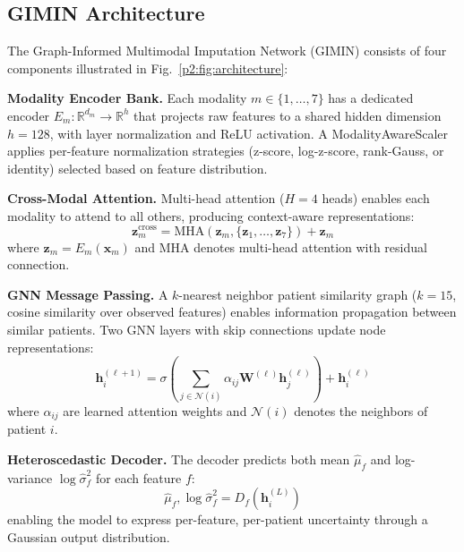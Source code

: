 \subsection{GIMIN Architecture}
\label{p2:sec:gimin}

The Graph-Informed Multimodal Imputation Network (GIMIN) consists of four components illustrated in Fig.~\ref{p2:fig:architecture}:

\textbf{Modality Encoder Bank.} Each modality $m \in \{1, \ldots, 7\}$ has a dedicated encoder $E_m: \mathbb{R}^{d_m} \to \mathbb{R}^{h}$ that projects raw features to a shared hidden dimension $h = 128$, with layer normalization and ReLU activation. A ModalityAwareScaler applies per-feature normalization strategies (z-score, log-z-score, rank-Gauss, or identity) selected based on feature distribution.

\textbf{Cross-Modal Attention.} Multi-head attention ($H = 4$ heads) enables each modality to attend to all others, producing context-aware representations:
\begin{equation}
\mathbf{z}_m^{\text{cross}} = \text{MHA}(\mathbf{z}_m, \{\mathbf{z}_1, \ldots, \mathbf{z}_7\}) + \mathbf{z}_m
\label{p2:eq:cross_attn}
\end{equation}
where $\mathbf{z}_m = E_m(\mathbf{x}_m)$ and MHA denotes multi-head attention with residual connection.

\textbf{GNN Message Passing.} A $k$-nearest neighbor patient similarity graph ($k = 15$, cosine similarity over observed features) enables information propagation between similar patients. Two GNN layers with skip connections update node representations:
\begin{equation}
\mathbf{h}_i^{(\ell+1)} = \sigma\!\left(\sum_{j \in \mathcal{N}(i)} \alpha_{ij} \mathbf{W}^{(\ell)} \mathbf{h}_j^{(\ell)}\right) + \mathbf{h}_i^{(\ell)}
\label{p2:eq:gnn}
\end{equation}
where $\alpha_{ij}$ are learned attention weights and $\mathcal{N}(i)$ denotes the neighbors of patient $i$.

\textbf{Heteroscedastic Decoder.} The decoder predicts both mean $\hat{\mu}_f$ and log-variance $\log \hat{\sigma}_f^2$ for each feature $f$:
\begin{equation}
\hat{\mu}_f, \log \hat{\sigma}_f^2 = D_f(\mathbf{h}_i^{(L)})
\label{p2:eq:decoder}
\end{equation}
enabling the model to express per-feature, per-patient uncertainty through a Gaussian output distribution.

